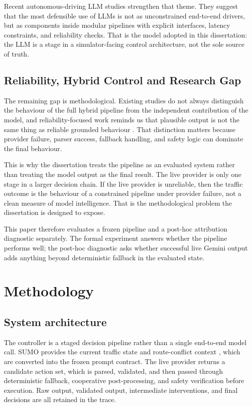 \documentclass[letterpaper,10pt,conference]{ieeeconf}
\begin{document}
Recent autonomous-driving LLM studies \cite{Li2024,Ma2024,Cui2024,Hou2025,Dong2026,Xie2025} strengthen that theme. They suggest that the most defensible use of LLMs is not as unconstrained end-to-end drivers, but as components inside modular pipelines with explicit interfaces, latency constraints, and reliability checks. That is the model adopted in this dissertation: the LLM is a stage in a simulator-facing control architecture, not the sole source of truth.

\subsection{Reliability, Hybrid Control and Research Gap}
The remaining gap is methodological. Existing studies do not always distinguish the behaviour of the full hybrid pipeline from the independent contribution of the model, and reliability-focused work reminds us that plausible output is not the same thing as reliable grounded behaviour \cite{Xie2025}. That distinction matters because provider failure, parser success, fallback handling, and safety logic can dominate the final behaviour.

This is why the dissertation treats the pipeline as an evaluated system rather than treating the model output as the final result. The live provider is only one stage in a larger decision chain. If the live provider is unreliable, then the traffic outcome is the behaviour of a constrained pipeline under provider failure, not a clean measure of model intelligence. That is the methodological problem the dissertation is designed to expose.

This paper therefore evaluates a frozen pipeline and a post-hoc attribution diagnostic separately. The formal experiment answers whether the pipeline performs well; the post-hoc diagnostic asks whether successful live Gemini output adds anything beyond deterministic fallback in the evaluated state.

\section{Methodology}
\subsection{System architecture}
The controller is a staged decision pipeline rather than a single end-to-end model call. SUMO provides the current traffic state and route-conflict context \cite{AlvarezLopez2018}, which are converted into the frozen prompt contract. The live provider returns a candidate action set, which is parsed, validated, and then passed through deterministic fallback, cooperative post-processing, and safety verification before execution. Raw output, validated output, intermediate interventions, and final decisions are all retained in the trace.
\end{document}
